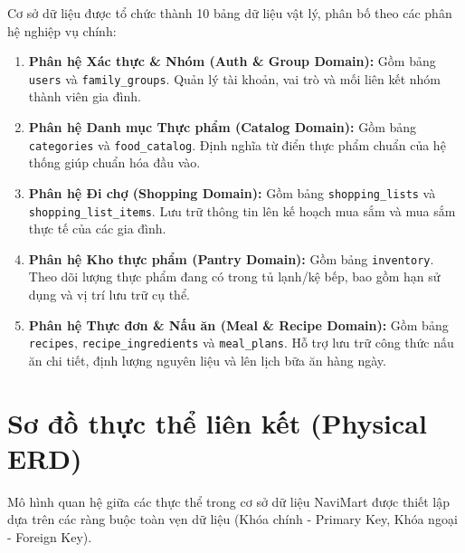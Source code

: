 \documentclass[12pt,a4paper]{article}
\begin{document}
Cơ sở dữ liệu được tổ chức thành 10 bảng dữ liệu vật lý, phân bố theo các phân hệ nghiệp vụ chính:
\begin{enumerate}
    \item \textbf{Phân hệ Xác thực \& Nhóm (Auth \& Group Domain):} Gồm bảng \texttt{users} và \texttt{family\_groups}. Quản lý tài khoản, vai trò và mối liên kết nhóm thành viên gia đình.
    \item \textbf{Phân hệ Danh mục Thực phẩm (Catalog Domain):} Gồm bảng \texttt{categories} và \texttt{food\_catalog}. Định nghĩa từ điển thực phẩm chuẩn của hệ thống giúp chuẩn hóa đầu vào.
    \item \textbf{Phân hệ Đi chợ (Shopping Domain):} Gồm bảng \texttt{shopping\_}\allowbreak\texttt{lists} và \texttt{shopping\_}\allowbreak\texttt{list\_}\allowbreak\texttt{items}. Lưu trữ thông tin lên kế hoạch mua sắm và mua sắm thực tế của các gia đình.
    \item \textbf{Phân hệ Kho thực phẩm (Pantry Domain):} Gồm bảng \texttt{inventory}. Theo dõi lượng thực phẩm đang có trong tủ lạnh/kệ bếp, bao gồm hạn sử dụng và vị trí lưu trữ cụ thể.
    \item \textbf{Phân hệ Thực đơn \& Nấu ăn (Meal \& Recipe Domain):} Gồm bảng \texttt{recipes}, \texttt{recipe\_ingredients} và \texttt{meal\_plans}. Hỗ trợ lưu trữ công thức nấu ăn chi tiết, định lượng nguyên liệu và lên lịch bữa ăn hàng ngày.
\end{enumerate}

\section{Sơ đồ thực thể liên kết (Physical ERD)}
Mô hình quan hệ giữa các thực thể trong cơ sở dữ liệu NaviMart được thiết lập dựa trên các ràng buộc toàn vẹn dữ liệu (Khóa chính - Primary Key, Khóa ngoại - Foreign Key). 
\end{document}
